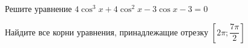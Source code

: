 \begin{ex}
	\begin{condition}
		\begin{enumcols}[label=\asbuk*)]
			\item Решите уравнение \( 4\cos^3 x +4\cos^2 x - 3\cos x -3 = 0 \)
			\item Найдите все корни уравнения, принадлежащие отрезку \( \left[2\pi;\dfrac{7\pi}{2}\right] \)
		\end{enumcols}
	\end{condition}
\end{ex}